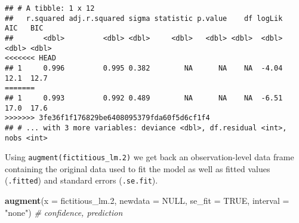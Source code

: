 \documentclass[
]{book}
\newenvironment{Shaded}{\begin{snugshade}}{\end{snugshade}}
\newcommand{\CommentTok}[1]{\textcolor[rgb]{0.56,0.35,0.01}{\textit{#1}}}
\newcommand{\DataTypeTok}[1]{\textcolor[rgb]{0.13,0.29,0.53}{#1}}
\newcommand{\FloatTok}[1]{\textcolor[rgb]{0.00,0.00,0.81}{#1}}
\newcommand{\KeywordTok}[1]{\textcolor[rgb]{0.13,0.29,0.53}{\textbf{#1}}}
\newcommand{\NormalTok}[1]{#1}
\newcommand{\OtherTok}[1]{\textcolor[rgb]{0.56,0.35,0.01}{#1}}
\newcommand{\StringTok}[1]{\textcolor[rgb]{0.31,0.60,0.02}{#1}}
\begin{document}
\begin{verbatim}
## # A tibble: 1 x 12
##   r.squared adj.r.squared sigma statistic p.value    df logLik   AIC   BIC
##       <dbl>         <dbl> <dbl>     <dbl>   <dbl> <dbl>  <dbl> <dbl> <dbl>
<<<<<<< HEAD
## 1     0.996         0.995 0.382        NA      NA    NA  -4.04  12.1  12.7
=======
## 1     0.993         0.992 0.489        NA      NA    NA  -6.51  17.0  17.6
>>>>>>> 3fe36f1f176829be6408095379fda60f5d6cf1f4
## # ... with 3 more variables: deviance <dbl>, df.residual <int>, nobs <int>
\end{verbatim}

Using \texttt{augment(fictitious\_lm.2)} we get back an observation-level data frame containing the original data used to fit the model as well as fitted values (\texttt{.fitted}) and standard errors (\texttt{.se.fit}).

\begin{Shaded}
\begin{Highlighting}[]
\KeywordTok{augment}\NormalTok{(}\DataTypeTok{x =}\NormalTok{ fictitious_lm}\FloatTok{.2}\NormalTok{,}
        \DataTypeTok{newdata =} \OtherTok{NULL}\NormalTok{,}
        \DataTypeTok{se_fit =} \OtherTok{TRUE}\NormalTok{,}
        \DataTypeTok{interval =} \StringTok{"none"}\NormalTok{) }\CommentTok{# confidence, prediction}
\end{Highlighting}
\end{Shaded}
\end{document}
